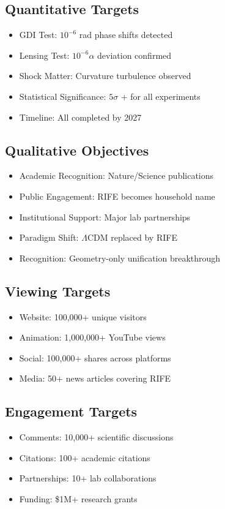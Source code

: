 \documentclass[11pt]{report}
\newcommand{\lamcdm}{$\Lambda$CDM}
\newcommand{\tenminus}{$10^{-6}$}
\newcommand{\tenminusalpha}{$10^{-6}\alpha$}
\newcommand{\fivesigma}{$5\sigma$}
\begin{document}
\subsection{Quantitative Targets}
\begin{itemize}
\item GDI Test: \tenminus{} rad phase shifts detected
\item Lensing Test: \tenminusalpha{} deviation confirmed
\item Shock Matter: Curvature turbulence observed
\item Statistical Significance: \fivesigma{} + for all experiments
\item Timeline: All completed by 2027
\end{itemize}

\subsection{Qualitative Objectives}
\begin{itemize}
\item Academic Recognition: Nature/Science publications
\item Public Engagement: RIFE becomes household name
\item Institutional Support: Major lab partnerships
\item Paradigm Shift: \lamcdm{} replaced by RIFE
\item Recognition: Geometry-only unification breakthrough
\end{itemize}

\subsection{Viewing Targets}
\begin{itemize}
\item Website: 100,000+ unique visitors
\item Animation: 1,000,000+ YouTube views
\item Social: 100,000+ shares across platforms
\item Media: 50+ news articles covering RIFE
\end{itemize}

\subsection{Engagement Targets}
\begin{itemize}
\item Comments: 10,000+ scientific discussions
\item Citations: 100+ academic citations
\item Partnerships: 10+ lab collaborations
\item Funding: \$1M+ research grants
\end{itemize}
\end{document}
